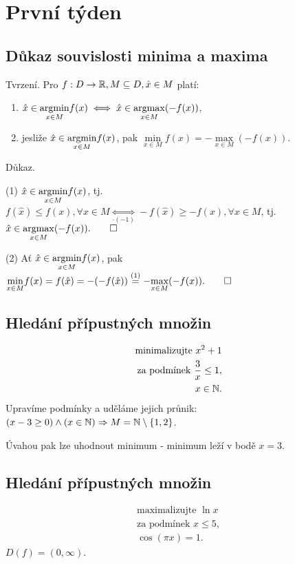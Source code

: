 \section{První týden}

\subsection{Důkaz souvislosti minima a maxima}

Tvrzení. Pro $f: D \rightarrow \mathbb{R}, M \subseteq D, \hat{x} \in M$ platí:

\begin{enumerate}[(1)]
    \item $\hat{x} \in \underset{x \in M}{\operatorname*{argmin}} f(x) \iff \hat{x} \in \underset{x \in M}{\operatorname*{argmax}} (-f(x))$,
    \item jesliže $\hat{x} \in \underset{x \in M}{\operatorname*{argmin}} f(x)$, pak $\underset{x \in M}{\min} f(x) = 
    - \underset{x \in M}{\max} (-f(x))$.
\end{enumerate}
Důkaz.

(1) $\hat{x} \in \underset{x \in M}{\operatorname*{argmin}} f(x)$, tj. $f(\hat{x}) \leq f(x), \forall x \in M \underset{\cdot (-1)}{\iff} 
-f(\hat{x}) \geq -f(x), \forall x \in M$, tj. $\hat{x} \in \underset{x \in M}{\operatorname*{argmax}} (-f(x)). \qed$


(2) Ať $\hat{x} \in \underset{x \in M}{\operatorname*{argmin}} f(x)$, pak $\underset{x \in M}{\min} f(x) = f(\hat{x}) = 
- (- f(\hat{x})) \overset{(1)}{=} - \underset{x \in M}{\max} (-f(x)). \qed$

\subsection{Hledání přípustných množin}
\begin{align*}
    \text{minimalizujte } x^2 + 1 \\
    \text{za podmínek } \frac{3}{x} \leq 1, \\
    x \in \mathbb{N}.
\end{align*}
Upravíme podmínky a uděláme jejich průnik: $(x - 3 \geq 0) \land (x \in \mathbb{N}) \Rightarrow M = \mathbb{N} \setminus \left\lbrace 1,2 \right\rbrace$.

Úvahou pak lze uhodnout minimum - minimum leží v bodě $x=3$.

\subsection{Hledání přípustných množin}
\begin{align*}
    \text{maximalizujte } \ln x \\
    \text{za podmínek } x \leq 5, \\
    \cos(\pi x) = 1.
\end{align*}
$D(f) = (0, \infty)$. 

